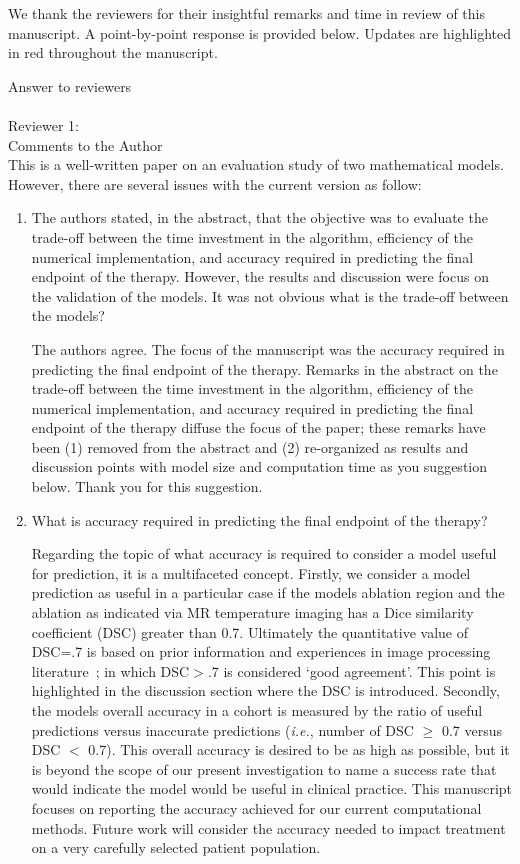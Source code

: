\documentclass[letterpaper,12pt]{report}
\begin{document}
{\color{red}
We thank the reviewers for their insightful remarks and time in review of
this manuscript. A point-by-point response is provided below.
Updates are highlighted in red throughout the manuscript. 
}

Answer to reviewers\\
\\
Reviewer 1:\\
Comments to the Author\\
This is a well-written paper on an evaluation study of
two mathematical models. However, there are several issues with the current version as follow:\\

\begin{enumerate}
\item
The authors stated, in the abstract, that the objective
was to evaluate the trade-off between the
time investment in the algorithm, efficiency of the numerical
implementation, and accuracy required in
predicting the final endpoint of the therapy. However,
the results and discussion were focus on the validation
of the models. It was not obvious what is the trade-off
between the models? 

{\color{red}
The authors agree. The focus of the manuscript was
the accuracy required in
predicting the final endpoint of the therapy. 
Remarks in the abstract on the trade-off between the
time investment in the algorithm, efficiency of the numerical
implementation, and accuracy required in
predicting the final endpoint of the therapy diffuse the focus
of the paper; these remarks have been (1) removed from the abstract and (2)
re-organized as results and  discussion points with model size and
computation time as you suggestion below.  Thank you for this suggestion.
}


\item What is accuracy required in predicting the final endpoint of the therapy?
 
{\color{red}

Regarding the topic of what accuracy is required to consider a model useful
for prediction, it is a multifaceted concept. Firstly, we consider a model
prediction as useful in a particular case if the models ablation region and
the ablation as indicated via MR temperature imaging has a Dice similarity
coefficient (DSC) greater than 0.7. Ultimately the quantitative value of
DSC=.7 is based on prior information and experiences in image processing
literature~\cite{yung2010quantitative,Dice1945measures,zou2004three};  
in which DSC$>$.7 is considered `good agreement'. This point is highlighted
in the discussion section where the DSC is introduced.
 Secondly, the models overall accuracy in
a cohort is measured by the ratio of useful predictions versus inaccurate
predictions (\textit{i.e.}, number of DSC $\geq$ 0.7 versus DSC $<$ 0.7).
This overall accuracy is desired to be as high as possible, but it is beyond the
scope of our present investigation to name a success rate that would
indicate the model would be useful in clinical practice. This manuscript
focuses on reporting the accuracy achieved for our current computational
methods. Future work will consider the accuracy needed to impact treatment 
on a very carefully selected patient population.

}
\end{enumerate}
\end{document}
